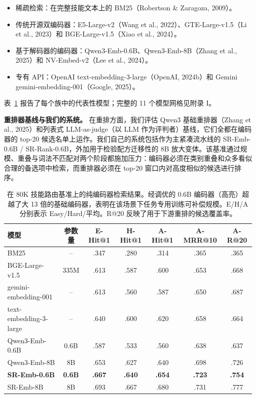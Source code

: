 \documentclass[11pt,UTF8,fontset=fandol]{ctexart}
\makeatletter
\newcommand{\Hit}{Hit@1}
\makeatother
\begin{document}
\begin{itemize}[leftmargin=2em]
\item 稀疏检索：在完整技能文本上的 BM25（Robertson \& Zaragoza, 2009）。
\item 传统开源双编码器：E5-Large-v2（Wang et al., 2022）、GTE-Large-v1.5（Li et al., 2023）和 BGE-Large-v1.5（Xiao et al., 2024）。
\item 基于解码器的编码器：Qwen3-Emb-0.6B、Qwen3-Emb-8B（Zhang et al., 2025）和 NV-Embed-v2（Lee et al., 2024）。
\item 专有 API：OpenAI text-embedding-3-large（OpenAI, 2024b）和 Gemini gemini-embedding-001（Google, 2025）。
\end{itemize}

表~\ref{tab:2} 报告了每个族中的代表性模型；完整的 11 个模型网格见附录 I。

\textbf{重排器基线与我们的系统。} 在重排方面，我们评估 Qwen3 基础重排器（Zhang et al., 2025）和列表式 LLM-as-judge（以 LLM 作为评判者）基线，它们全都在编码器的 top-20 候选名单上运作。我们自己的系统包括作为主紧凑流水线的 SR-Emb-0.6B / SR-Rank-0.6B，外加用于检验配方迁移性的 8B 放大变体。该基准通过规模、重叠与词法不匹配对两个阶段都施加压力：编码器必须在类别重叠和众多看似合理的备选项中检索，而重排器必须在 top-20 窗口内对高度相似的候选进行排序。

\begin{table}[H]\centering
\caption{在 80K 技能路由基准上的纯编码器检索结果。经调优的 0.6B 编码器（高亮）超越了大 13 倍的基础编码器，表明在该场景下任务专用训练可补偿规模。E/H/A 分别表示 Easy/Hard/平均。R@20 反映了用于下游重排的候选覆盖率。}
\begin{tabular}{lcccccc}
\toprule
模型 & 参数量 & E-\Hit{} & H-\Hit{} & A-\Hit{} & A-MRR@10 & A-R@20 \\ \midrule
BM25 & -- & .347 & .280 & .314 & .365 & .365 \\
BGE-Large-v1.5 & 335M & .613 & .587 & .600 & .653 & .668 \\
gemini-embedding-001 & -- & .613 & .560 & .587 & .650 & .687 \\
text-embedding-3-large & -- & .640 & .600 & .620 & .658 & .664 \\
Qwen3-Emb-0.6B & 0.6B & .587 & .533 & .560 & .638 & .637 \\
Qwen3-Emb-8B & 8B & .653 & .627 & .640 & .698 & .726 \\
\textbf{SR-Emb-0.6B} & \textbf{0.6B} & \textbf{.667} & \textbf{.640} & \textbf{.654} & \textbf{.723} & \textbf{.754} \\
SR-Emb-8B & 8B & .693 & .667 & .680 & .731 & .777 \\
\bottomrule
\end{tabular}
\label{tab:2}
\end{table}
\end{document}
